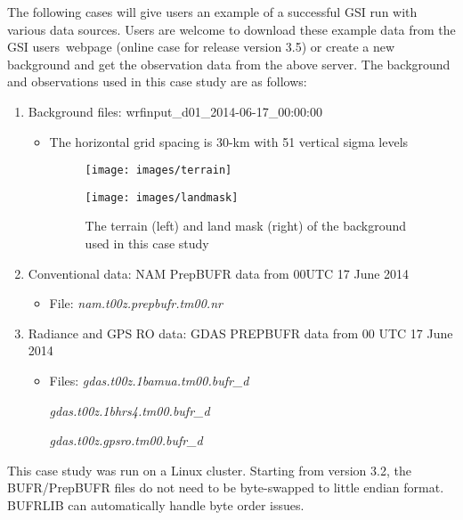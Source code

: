 The following cases will give users an example of a successful GSI run with various data sources.  Users are welcome to download these example data from the GSI users\textquotesingle \ webpage (online case for release version 3.5) or create a new background and get the observation data from the above server.  The background and observations used in this case study are as follows:

\begin{enumerate}
\item Background files: wrfinput\_d01\_2014-06-17\_00:00:00
\begin{itemize}
\item The horizontal grid spacing is 30-km with 51 vertical sigma levels
\begin{figure}[h!]
  \begin{minipage}[t]{0.5\linewidth}
  \centering
  \texttt{[image: images/terrain]}
  \end{minipage} %
  \begin{minipage}[t]{0.5\linewidth}
  \centering
  \texttt{[image: images/landmask]}
  \end{minipage}
  \caption{The terrain (left) and land mask (right) of the background used in this case study}
  \label{fig:terland}
\end{figure}
\end{itemize}
\item Conventional data: NAM PrepBUFR data from 00UTC 17 June 2014
\begin{itemize}
\item File: \textit{nam.t00z.prepbufr.tm00.nr}
\end{itemize}
\item Radiance and GPS RO data: GDAS PREPBUFR data from 00 UTC 17 June 2014
\begin{itemize}
\item Files: \textit{gdas.t00z.1bamua.tm00.bufr\_d}

     \qquad\quad  \textit{gdas.t00z.1bhrs4.tm00.bufr\_d}

     \qquad\quad  \textit{gdas.t00z.gpsro.tm00.bufr\_d}
\end{itemize}
\end{enumerate}

This case study was run on a Linux cluster. Starting from version 3.2, the BUFR/PrepBUFR files do not need to be byte-swapped to little endian format. BUFRLIB can automatically handle byte order issues.

